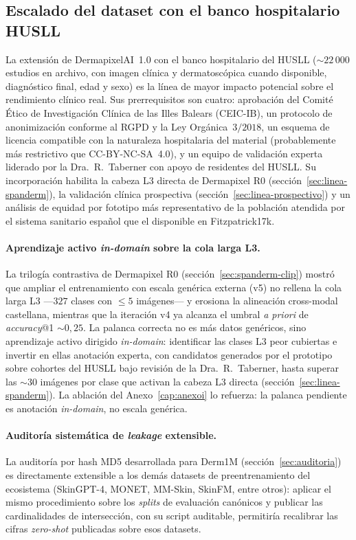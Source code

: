 \subsection{Escalado del dataset con el banco hospitalario HUSLL}
\label{sec:linea-husll}

La extensión de DermapixelAI~1.0 con el banco hospitalario del HUSLL
($\sim 22\,000$ estudios en archivo, con imagen clínica y dermatoscópica
cuando disponible, diagnóstico final, edad y sexo) es la línea de mayor
impacto potencial sobre el rendimiento clínico real. Sus prerrequisitos
son cuatro: aprobación del Comité Ético de Investigación Clínica de las
Illes Balears (CEIC-IB), un protocolo de anonimización conforme al RGPD y
la Ley Orgánica~$3/2018$, un esquema de licencia compatible con la
naturaleza hospitalaria del material (probablemente más restrictivo que
CC-BY-NC-SA~4.0), y un equipo de validación experta liderado por la
Dra.~R.~Taberner con apoyo de residentes del HUSLL. Su incorporación
habilita la cabeza L3 directa de Dermapixel R0
(sección~\ref{sec:linea-spanderm}), la validación clínica prospectiva
(sección~\ref{sec:linea-prospectivo}) y un análisis de equidad por
fototipo más representativo de la población atendida por el sistema
sanitario español que el disponible en Fitzpatrick17k.

\paragraph{Aprendizaje activo \emph{in-domain} sobre la cola larga L3.}
\label{sec:linea-active-learning}
La trilogía contrastiva de Dermapixel R0
(sección~\ref{sec:spanderm-clip}) mostró que ampliar el entrenamiento con
escala genérica externa (v5) no rellena la cola larga L3 ---$327$ clases
con $\leq 5$ imágenes--- y erosiona la alineación cross-modal castellana,
mientras que la iteración v4 ya alcanza el umbral \emph{a priori} de
\emph{accuracy}@1 $\sim 0{,}25$. La palanca correcta no es más datos
genéricos, sino aprendizaje activo dirigido \emph{in-domain}: identificar
las clases L3 peor cubiertas e invertir en ellas anotación experta, con
candidatos generados por el prototipo sobre cohortes del HUSLL bajo
revisión de la Dra.~R.~Taberner, hasta superar las $\sim 30$ imágenes por
clase que activan la cabeza L3 directa
(sección~\ref{sec:linea-spanderm}). La ablación del Anexo~\ref{cap:anexoi}
lo refuerza: la palanca pendiente es anotación \emph{in-domain}, no escala
genérica.

\paragraph{Auditoría sistemática de \emph{leakage} extensible.}
\label{sec:linea-leakage}
La auditoría por hash MD5 desarrollada para Derm1M
(sección~\ref{sec:auditoria}) es directamente extensible a los demás
datasets de preentrenamiento del ecosistema (SkinGPT-4, MONET, MM-Skin,
SkinFM, entre otros): aplicar el mismo procedimiento sobre los
\emph{splits} de evaluación canónicos y publicar las cardinalidades de
intersección, con su script auditable, permitiría recalibrar las cifras
\emph{zero-shot} publicadas sobre esos datasets.

